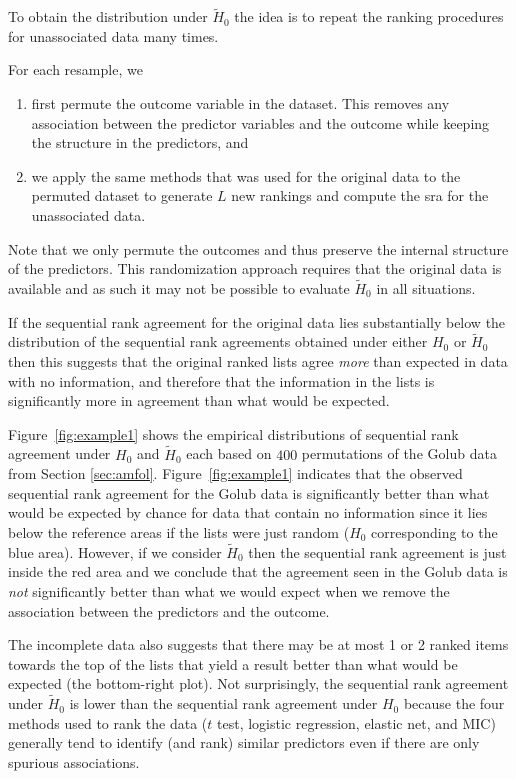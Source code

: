 \documentclass[oupdraft]{bio}
\newcommand{\added}[1]{{\color{added}{}#1}}
\begin{document}
To obtain the distribution under $\widetilde H_0$ the idea is to
repeat the ranking procedures for unassociated data many times.
\added{For each resample, we
  \begin{enumerate}
  \item first permute the outcome variable in the dataset. This
    removes any association between the predictor variables and the
    outcome while keeping the structure in the predictors, and 
  \item we apply the same methods that was used for the original data to the permuted dataset to generate $L$
    new rankings and compute the sra for the unassociated data.
  \end{enumerate}
} Note that we only permute the outcomes and thus preserve the
internal structure of the predictors. This randomization approach
requires that the original data is available and as such it may not be
possible to evaluate $\widetilde H_0$ in all situations.

If the sequential rank agreement for the original data lies
substantially below the distribution of the sequential rank agreements
obtained under either $H_0$ or $\widetilde H_0$ then this suggests that
the original ranked lists agree \emph{more} than expected
in data with no information, and therefore that the information in the
lists is significantly more in agreement than what would be expected.

Figure~\ref{fig:example1} shows the empirical distributions of
sequential rank agreement under $H_0$ and $\widetilde H_0$ each based
on $400$ permutations of the Golub data from Section \ref{sec:amfol}.
\added{ Figure~\ref{fig:example1} indicates that the observed
  sequential rank agreement for the Golub data is significantly better
  than what would be expected by chance for data that contain no
  information since it lies below the reference areas if the lists
  were just random ($H_0$ corresponding to the blue area). However, if
  we consider $\widetilde H_0$ then the sequential rank agreement is
  just inside the red area and we conclude that the agreement seen in
  the Golub data is \emph{not} significantly better than what we would
  expect when we remove the association between the predictors and
  the outcome.}


The incomplete data also suggests that there may be at most 1 or 2
ranked items towards the top of the lists that yield a result better
than what would be expected (the bottom-right plot). Not surprisingly,
the sequential rank agreement under $\widetilde H_0$ is lower than the
sequential rank agreement under $H_0$ because the four methods used to
rank the data ($t$ test, logistic regression, elastic net, and MIC)
generally tend to identify (and rank) similar predictors even if there
are only spurious associations.
\end{document}
